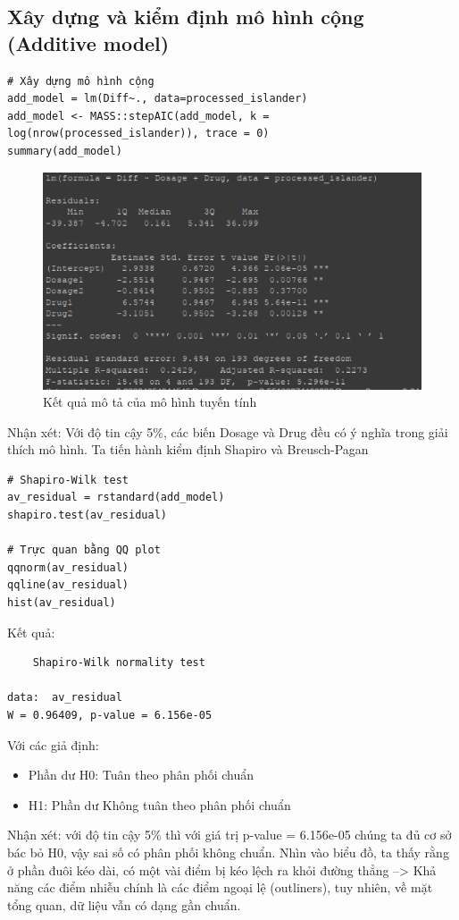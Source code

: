 \subsection{Xây dựng và kiểm định mô hình cộng (Additive model)}
\begin{lstlisting}
# Xây dựng mô hình cộng
add_model = lm(Diff~., data=processed_islander)
add_model <- MASS::stepAIC(add_model, k = log(nrow(processed_islander)), trace = 0)
summary(add_model)
\end{lstlisting}
\begin{figure}[H]
    \centering
    \includegraphics[width=0.8\linewidth]{part01_figures/19.png}
    \caption{Kết quả mô tả của mô hình tuyến tính}
    \label{fig:Kết quả mô tả của mô hình tuyến tính}
\end{figure}

Nhận xét:  Với độ tin cậy 5\%, các biến Dosage và Drug đều có ý nghĩa trong giải thích mô hình. Ta tiến hành kiểm định Shapiro và Breusch-Pagan

\begin{lstlisting}
# Shapiro-Wilk test
av_residual = rstandard(add_model)
shapiro.test(av_residual)

# Trực quan bằng QQ plot
qqnorm(av_residual)
qqline(av_residual)
hist(av_residual)
\end{lstlisting}

Kết quả:
\begin{lstlisting}
    Shapiro-Wilk normality test

data:  av_residual
W = 0.96409, p-value = 6.156e-05
\end{lstlisting}

Với các giả định:
    \begin{itemize}
        \item Phần dư H0: Tuân theo phân phối chuẩn
        \item H1: Phần dư Không tuân theo phân phối chuẩn
    \end{itemize}
Nhận xét: với độ tin cậy 5\% thì với giá trị p-value = 6.156e-05 chúng ta đủ cơ sở bác bỏ H0, vậy sai số có phân phối không chuẩn. Nhìn vào biểu đồ, ta thấy rằng ở phần đuôi kéo dài, có một vài điểm bị kéo lệch ra khỏi đường thẳng --> Khả năng các điểm nhiễu chính là các điểm ngoại lệ (outliners), tuy nhiên, về mặt tổng quan, dữ liệu vẫn có dạng gần chuẩn.

